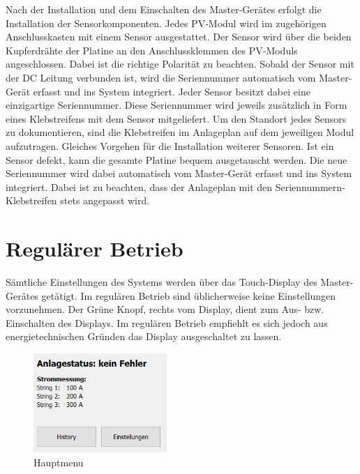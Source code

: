 Nach der  Installation und dem  Einschalten des Master-Ger\"ates   erfolgt die
Installation  der Sensorkomponenten. Jedes  PV-Modul  wird im    zugeh\"origen
Anschlusskasten  mit einem  Sensor  ausgestattet. Der Sensor  wird \"uber  die
beiden  Kupferdr\"ahte  der  Platine  an den  Anschlussklemmen  des  PV-Moduls
angeschlossen. Dabei  ist die  richtige  Polarit\"at  zu beachten. Sobald  der
Sensor mit der DC Leitung verbunden ist, wird die Seriennummer automatisch vom
Master-Ger\"at erfasst  und ins System integriert. Jeder  Sensor besitzt dabei
eine einzigartige  Seriennummer. Diese Seriennummer wird  jeweils zus\"atzlich
in  Form eines  Klebstreifens  mit dem  Sensor  mitgeliefert. Um den  Standort
jedes  Sensors  zu dokumentieren,  sind  die  Klebstreifen im  Anlageplan  auf
dem  jeweiligen Modul  aufzutragen. Gleiches Vorgehen  f\"ur die  Installation
weiterer Sensoren.   Ist ein  Sensor defekt, kann  die gesamte  Platine bequem
ausgetauscht  werden. Die   neue  Seriennummer  wird  dabei   automatisch  vom
Master-Ger\"at erfasst und ins System  integriert. Dabei ist zu beachten, dass
der Anlageplan mit den Seriennummern-Klebstreifen stets angepasst wird.


\section{Regul\"arer Betrieb}
\label{sec:userguide:regular}

S\"amtliche  Einstellungen des  Systems  werden \"uber  das Touch-Display  des
Master-Ger\"ates get\"atigt. Im regul\"aren Betrieb sind \"ublicherweise keine
Einstellungen vorzunehmen. Der  Gr\"une Knopf,  rechts vom Display,  dient zum
Aus- bzw. Einschalten  des Displays. Im regul\"aren Betrieb  empfiehlt es sich
jedoch aus energietechnischen Gr\"unden das Display ausgeschaltet zu lassen.

\begin{figure}
    \includegraphics[width=0.45\textwidth]{images/userguide/screen0.png}
    \caption{Hauptmenu}
    \label{fig:userguide:screen0}
\end{figure}

